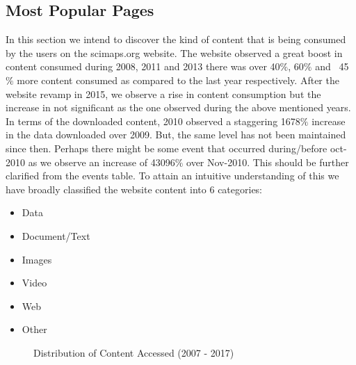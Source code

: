 \subsection{Most Popular Pages} \label{viztoppages}
In this section we intend to discover the kind of content that is being consumed by the users on the scimaps.org website. 
The website observed a great boost in content consumed during 2008, 2011 and 2013 there was over 40$\%$, 60$\%$ and ~45$\%$ more content consumed as compared to the last year respectively. After the website revamp in 2015, we observe a rise in content consumption but the increase in not significant as the one observed during the above mentioned years. 
In terms of the downloaded content, 2010 observed a staggering 1678$\%$ increase in the data downloaded over 2009. But, the same level has not been maintained since then. Perhaps there might be some event that occurred during/before oct-2010 as we observe an increase of 43096$\%$ over Nov-2010. This should be further clarified from the events table.
To attain an intuitive understanding of this we have broadly classified the website content into 6 categories:
\begin{itemize}
\item Data
\item Document/Text
\item Images
\item Video
\item Web
\item Other
\end{itemize}

\begin{figure}
\centering
{}
\caption{Distribution of Content Accessed (2007 - 2017)}
\label{fig:TopURLs}
\end{figure}

